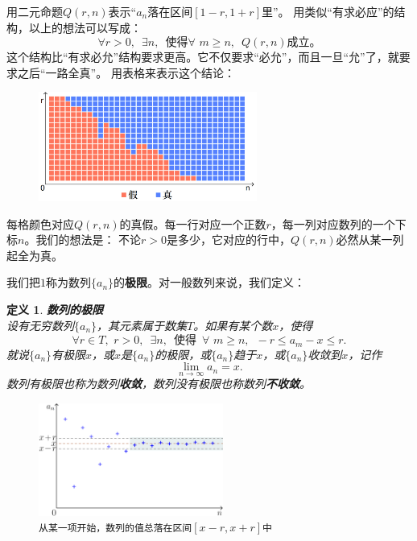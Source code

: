 \documentclass[12pt,UTF8]{ctexbook}
\newtheorem{df}{定义}[section]
\begin{document}
用二元命题$Q(r, n)$表示“$a_n$落在区间$[1-r,1+r]$里”。
用类似“有求必应”的结构，以上的想法可以写成：
$$\forall r > 0, \,\,\, \exists n,  \,\,\, \mbox{使得} \forall \,\, m \geqslant n, \,\,\, Q(r, n)\mbox{成立。}$$
这个结构比“有求必允”结构要求更高。它不仅要求“必允”，而且一旦“允”了，就要求之后“一路全真”。
用表格来表示这个结论：

\begin{figure}[h] %
    \centering
    \includegraphics[width=0.64\textwidth]{数列极限2.png}
\end{figure}

每格颜色对应$Q(r, n)$的真假。每一行对应一个正数$r$，每一列对应数列的一个下标$n$。我们的想法是：
不论$r>0$是多少，它对应的行中，$Q(r, n)$必然从某一列起全为真。

我们把$1$称为数列$\{a_n\}$的\textbf{极限}。对一般数列来说，我们定义：
\begin{df}\textbf{数列的极限} \\
设有无穷数列$\{a_n\}$，其元素属于数集$T$。如果有某个数$x$，使得
$$ \forall r\in T, \,\, r > 0, \,\,\, \exists n,  \,\,\, \mbox{使得} \,\,\, \forall \,\, m \geqslant n, \,\,\, - r \leqslant a_m - x \leqslant r. $$
就说$\{a_n\}$有极限$x$，或$x$是$\{a_n\}$的极限，或$\{a_n\}$趋于$x$，或$\{a_n\}$收敛到$x$，记作
$$\lim_{n\to\infty} a_n = x.$$
数列有极限也称为数列\textbf{收敛}，数列没有极限也称数列\textbf{不收敛}。
\end{df}

\begin{figure}[h] %
    \vspace{-14pt}
    \centering
    \includegraphics[width=0.54\textwidth]{数列极限1.png}
    \caption*{\texttt{从某一项开始，数列的值总落在区间}$[x-r,x+r]$\texttt{中}}
\end{figure}
\end{document}
